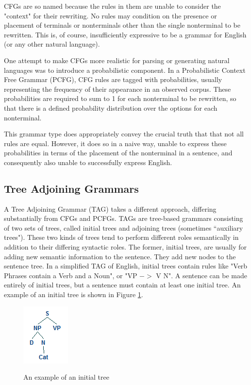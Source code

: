 CFGs are so named because the rules in them are unable to consider the "context" for
their rewriting.  No rules may condition on the presence or placement of terminals
or nonterminals other than the single nonterminal to be rewritten.  This is, of course,
insufficiently expressive to be a grammar for English (or any other natural language).

One attempt to make CFGs more realistic for parsing or generating natural languages was to
introduce a probabilistic component.  In a Probabilistic Context Free Grammar (PCFG), CFG
rules are tagged with probabilities, usually representing the frequency of their appearance in
an observed corpus.  These probabilities are required to sum to 1 for each nonterminal to
be rewritten, so that there is a defined probability distribution over the options for each nonterminal.

This grammar type does appropriately convey the crucial truth that that not all rules are equal.
However, it does so in a naive way, unable to express these probabilities in terms of the placement
of the nonterminal in a sentence, and consequently also unable to successfully express English.

\subsection{Tree Adjoining Grammars}

A Tree Adjoining Grammar (TAG) takes a different approach, differing substantially from CFGs and PCFGs.
TAGs are tree-based grammars consisting of two sets of trees, called initial
trees and adjoining trees (sometimes ``auxiliary trees").  These two kinds of trees tend to perform
different roles semantically in addition to their differing syntactic roles.  The former,
initial trees, are usually for adding new semantic information to the sentence.  They
add new nodes to the sentence tree.  In a simplified TAG of English,
initial trees contain rules like "Verb Phrases contain a Verb and a Noun", or "VP $->$ V N".
A sentence can be made entirely of initial trees, but a sentence must contain at least
one initial tree.  An example of an initial tree is shown in Figure \ref{initial-tree-example}.

\begin{figure}
\centering
\caption{An example of an initial tree}
\includegraphics{initial-example.png}
\label{initial-tree-example}
\end{figure}

